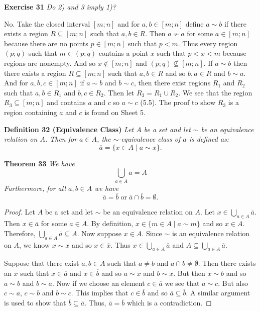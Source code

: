 \documentclass{article}
\begin{document}
\begin{flushleft}
\textbf{Exercise 31}
\textsl{Do 2) and 3 imply 1)?}\newline

No. Take the closed interval $[m;n]$ and for $a,b \in [m;n]$ define $a \sim b$ if there exists a region $R \subseteq [m;n]$ such that $a,b \in R$. Then $a \nsim a$ for some $a \in [m;n]$ because there are no points $p \in [m;n]$ such that $p<m$. Thus every region $(p;q)$ such that $m \in (p;q)$ contains a point $x$ such that $p<x<m$ because regions are nonempty. And so $x \notin [m;n]$ and $(p;q) \nsubseteq [m;n]$. If $a \sim b$ then there exists a region $R \subseteq [m;n]$ such that $a,b \in R$ and so $b,a \in R$ and $b \sim a$. And for $a,b,c \in [m;n]$ if $a \sim b$ and $b \sim c$, then there exist regions $R_1$ and $R_2$ such that $a,b \in R_1$ and $b,c \in R_2$. Then let $R_3 = R_1 \cup R_2$. We see that the region $R_3 \subseteq [m;n]$ and contains $a$ and $c$ so $a \sim c$ (5.5). The proof to show $R_3$ is a region containing $a$ and $c$ is found on Sheet 5.\newline

\textbf{Definition 32 (Equivalence Class)}
\textsl{Let $A$ be a set and let $\sim$ be an equivalence relation on $A$. Then for $a \in A$, the $\sim$-equivalence class of $a$ is defined as:
\[
\overline{a} = \{x \in A \mid a \sim x\}.
\]}

\textbf{Theorem 33}
\textsl{We have
\[
\bigcup_{a \in A} \overline{a} = A
\]
Furthermore, for all $a,b \in A$ we have
\[
\overline{a} = \overline{b} \; \text{or} \; \overline{a} \cap \overline{b} = \emptyset.
\]}
\begin{proof}
Let $A$ be a set and let $\sim$ be an equivalence relation on $A$. Let $x \in \bigcup_{a \in A} \overline{a}$. Then $x \in \overline{a}$ for some $a \in A$. By definition, $x \in \{ m \in A \mid a \sim m \}$ and so $x \in A$. Therefore, $\bigcup_{a \in A} \overline{a} \subseteq A$. Now suppose $x \in A$. Since $\sim$ is an equivalence relation on $A$, we know $x \sim x$ and so $x \in \overline{x}$. Thus $x \in \bigcup_{a \in A} \overline{a}$ and $A \subseteq \bigcup_{a \in A} \overline{a}$.\newline

Suppose that there exist $a,b \in A$ such that $\overline{a} \neq \overline{b}$ and $\overline{a} \cap \overline{b} \neq \emptyset$. Then there exists an $x$ such that $x \in \overline{a}$ and $x \in \overline{b}$ and so $a \sim x$ and $b \sim x$. But then $x \sim b$ and so $a \sim b$ and $b \sim a$. Now if we choose an element $c \in \overline{a}$ we see that $a \sim c$. But also $c \sim a$, $c \sim b$ and $b \sim c$. This implies that $c \in \overline{b}$ and so $\overline{a} \subseteq \overline{b}$. A similar argument is used to show that $\overline{b} \subseteq \overline{a}$. Thus, $\overline{a} = \overline{b}$ which is a contradiction.
\end{proof}


\end{flushleft}
\end{document}
